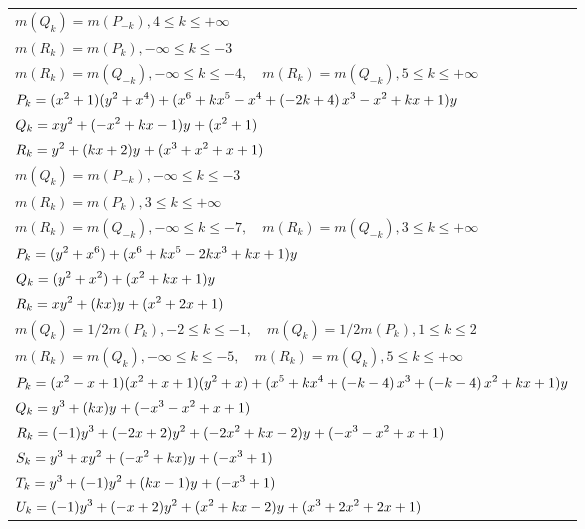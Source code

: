 \documentclass{amsart}
\begin{document}
\begin{longtable}{|l|}
\(\displaystyle m(Q_k) = m(P_{-k}),4 \leqslant k \leqslant +\infty\)\\
\(\displaystyle m(R_k) = m(P_{k}),-\infty \leqslant k \leqslant -3\)\\
\(\displaystyle m(R_k) = m(Q_{-k}),-\infty \leqslant k \leqslant -4,\quad m(R_k) = m(Q_{-k}),5 \leqslant k \leqslant +\infty\)\\
\hline
\(\displaystyle P_k=(x^2
 + 1)(y^2+x^4)+(x^6
 + k\*x^5
 - x^4
 + \left(-2\*k
 + 4\right) \*x^3
 - x^2
 + k\*x
 + 1)y\)\\
\(\displaystyle Q_k=xy^{2}+(-x^2
 + k\*x
 - 1)y^{}+(x^2
 + 1)\)\\
\(\displaystyle R_k=y^{2}+(k\*x
 + 2)y^{}+(x^3
 + x^2
 + x
 + 1)\)\\
\(\displaystyle m(Q_k) = m(P_{-k}),-\infty \leqslant k \leqslant -3\)\\
\(\displaystyle m(R_k) = m(P_{k}),3 \leqslant k \leqslant +\infty\)\\
\(\displaystyle m(R_k) = m(Q_{-k}),-\infty \leqslant k \leqslant -7,\quad m(R_k) = m(Q_{-k}),3 \leqslant k \leqslant +\infty\)\\
\hline
\(\displaystyle P_k=(y^2+x^6)+(x^6
 + k\*x^5
 - 2\*k\*x^3
 + k\*x
 + 1)y\)\\
\(\displaystyle Q_k=(y^2+x^2)+(x^2
 + k\*x
 + 1)y\)\\
\(\displaystyle R_k=xy^{2}+(k\*x)y^{}+(x^2
 + 2\*x
 + 1)\)\\
\(\displaystyle m(Q_k) = 1/2m(P_{k}),-2 \leqslant k \leqslant -1,\quad m(Q_k) = 1/2m(P_{k}),1 \leqslant k \leqslant 2\)\\
\(\displaystyle m(R_k) = m(Q_{k}),-\infty \leqslant k \leqslant -5,\quad m(R_k) = m(Q_{k}),5 \leqslant k \leqslant +\infty\)\\
\hline
\(\displaystyle P_k=(x^2
 - x
 + 1)(x^2
 + x
 + 1)(y^2+x)+(x^5
 + k\*x^4
 + \left(-k
 - 4\right) \*x^3
 + \left(-k
 - 4\right) \*x^2
 + k\*x
 + 1)y\)\\
\(\displaystyle Q_k=y^{3}+(k\*x)y^{}+(-x^3
 - x^2
 + x
 + 1)\)\\
\(\displaystyle R_k=(-1)y^{3}+(-2\*x
 + 2)y^{2}+(-2\*x^2
 + k\*x
 - 2)y^{}+(-x^3
 - x^2
 + x
 + 1)\)\\
\(\displaystyle S_k=y^{3}+xy^{2}+(-x^2
 + k\*x)y^{}+(-x^3
 + 1)\)\\
\(\displaystyle T_k=y^{3}+(-1)y^{2}+(k\*x
 - 1)y^{}+(-x^3
 + 1)\)\\
\(\displaystyle U_k=(-1)y^{3}+(-x
 + 2)y^{2}+(x^2
 + k\*x
 - 2)y^{}+(x^3
 + 2\*x^2
 + 2\*x
 + 1)\)\\

\end{longtable}
\end{document}
